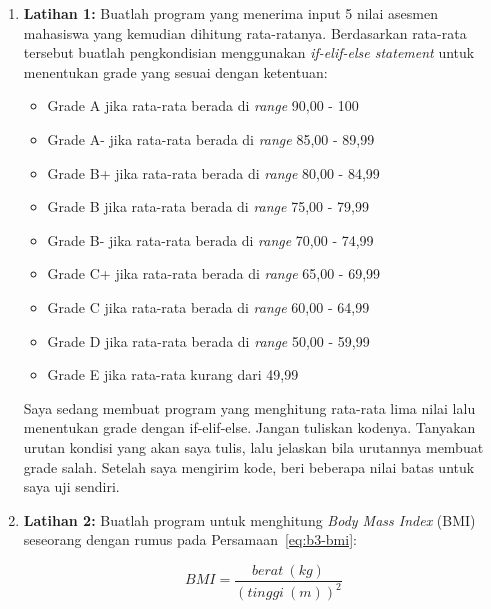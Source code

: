 \begin{enumerate}
\item \textbf{Latihan 1:} Buatlah program yang menerima input 5 nilai asesmen mahasiswa yang kemudian dihitung rata-ratanya. Berdasarkan rata-rata tersebut buatlah pengkondisian menggunakan \textit{if-elif-else statement} untuk menentukan grade yang sesuai dengan ketentuan:
\begin{itemize}
    \item Grade A jika rata-rata berada di \textit{range} 90,00 - 100
    \item Grade A- jika rata-rata berada di \textit{range} 85,00 - 89,99
    \item Grade B+ jika rata-rata berada di \textit{range} 80,00 - 84,99
    \item Grade B jika rata-rata berada di \textit{range} 75,00 - 79,99
    \item Grade B- jika rata-rata berada di \textit{range} 70,00 - 74,99
    \item Grade C+ jika rata-rata berada di \textit{range} 65,00 - 69,99
    \item Grade C jika rata-rata berada di \textit{range} 60,00 - 64,99
    \item Grade D jika rata-rata berada di \textit{range} 50,00 - 59,99
    \item Grade E jika rata-rata kurang dari 49,99
\end{itemize}

  \begin{promptterarah}
  Saya sedang membuat program yang menghitung rata-rata lima nilai lalu menentukan grade dengan if-elif-else. Jangan tuliskan kodenya. Tanyakan urutan kondisi yang akan saya tulis, lalu jelaskan bila urutannya membuat grade salah. Setelah saya mengirim kode, beri beberapa nilai batas untuk saya uji sendiri.
  \end{promptterarah}
\item \textbf{Latihan 2:} Buatlah program untuk menghitung \textit{Body Mass Index} (BMI) seseorang dengan rumus pada Persamaan~\eqref{eq:b3-bmi}:

\begin{equation}
  BMI = \frac{berat \ (kg)}{(tinggi \ (m))^2}
  \label{eq:b3-bmi}
\end{equation}


\end{enumerate}
